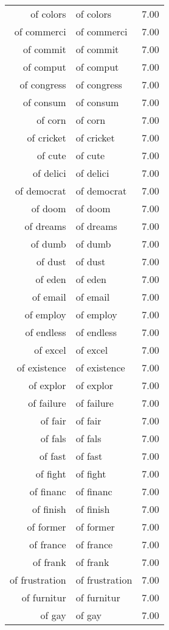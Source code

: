 \begin{table}[ht]
\begin{tabular}{rlr}
  of colors & of colors & 7.00 \\ 
  of commerci & of commerci & 7.00 \\ 
  of commit & of commit & 7.00 \\ 
  of comput & of comput & 7.00 \\ 
  of congress & of congress & 7.00 \\ 
  of consum & of consum & 7.00 \\ 
  of corn & of corn & 7.00 \\ 
  of cricket & of cricket & 7.00 \\ 
  of cute & of cute & 7.00 \\ 
  of delici & of delici & 7.00 \\ 
  of democrat & of democrat & 7.00 \\ 
  of doom & of doom & 7.00 \\ 
  of dreams & of dreams & 7.00 \\ 
  of dumb & of dumb & 7.00 \\ 
  of dust & of dust & 7.00 \\ 
  of eden & of eden & 7.00 \\ 
  of email & of email & 7.00 \\ 
  of employ & of employ & 7.00 \\ 
  of endless & of endless & 7.00 \\ 
  of excel & of excel & 7.00 \\ 
  of existence & of existence & 7.00 \\ 
  of explor & of explor & 7.00 \\ 
  of failure & of failure & 7.00 \\ 
  of fair & of fair & 7.00 \\ 
  of fals & of fals & 7.00 \\ 
  of fast & of fast & 7.00 \\ 
  of fight & of fight & 7.00 \\ 
  of financ & of financ & 7.00 \\ 
  of finish & of finish & 7.00 \\ 
  of former & of former & 7.00 \\ 
  of france & of france & 7.00 \\ 
  of frank & of frank & 7.00 \\ 
  of frustration & of frustration & 7.00 \\ 
  of furnitur & of furnitur & 7.00 \\ 
  of gay & of gay & 7.00 \\ 

\end{tabular}
\end{table}
